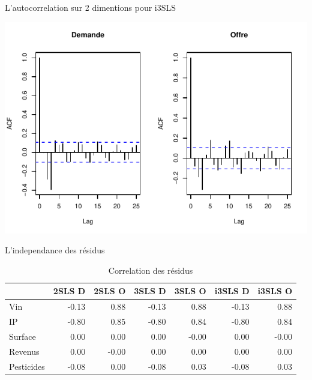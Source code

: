 \documentclass[11pt,ignorenonframetext,]{beamer}
\begin{document}
\begin{frame}{L'autocorrelation sur 2 dimentions pour i3SLS}
\protect\hypertarget{lautocorrelation-sur-2-dimentions-pour-i3sls}{}

\tiny

\begin{center}\includegraphics{Presentation_files/figure-beamer/unnamed-chunk-64-1} \end{center}

\normalsize

\end{frame}

\begin{frame}{L'independance des résidus}
\protect\hypertarget{lindependance-des-residus}{}

\tiny

\begin{table}[ht]
\centering
\begin{tabular}{l|rrrrrr}
  \hline
 & 2SLS D & 2SLS O & 3SLS D & 3SLS O & i3SLS D & i3SLS O \\ 
  \hline
Vin & -0.13 & 0.88 & -0.13 & 0.88 & -0.13 & 0.88 \\ 
  IP & -0.80 & 0.85 & -0.80 & 0.84 & -0.80 & 0.84 \\ 
  Surface & 0.00 & 0.00 & 0.00 & -0.00 & 0.00 & -0.00 \\ 
  Revenus & 0.00 & -0.00 & 0.00 & 0.00 & 0.00 & 0.00 \\ 
  Pesticides & -0.08 & 0.00 & -0.08 & 0.03 & -0.08 & 0.03 \\ 
   \hline
\end{tabular}
\caption{Correlation des résidus} 
\end{table}

\normalsize

\end{frame}
\end{document}
